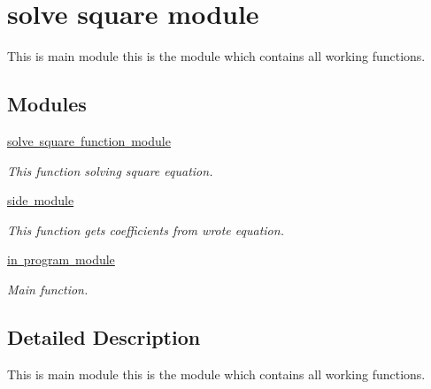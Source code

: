 \hypertarget{group__main__module}{}\section{solve square module}
\label{group__main__module}


This is main module this is the module which contains all working functions.  


\subsection*{Modules}
\begin{DoxyCompactItemize}
\item 
\mbox{\hyperlink{group__first__module}{solve square function module}}
\begin{DoxyCompactList}\small\item\em This function solving square equation. \end{DoxyCompactList}\item 
\mbox{\hyperlink{group__second__module}{side module}}
\begin{DoxyCompactList}\small\item\em This function get\textquotesingle{}s coefficients from wrote equation. \end{DoxyCompactList}\item 
\mbox{\hyperlink{group__third__module}{in program module}}
\begin{DoxyCompactList}\small\item\em Main function. \end{DoxyCompactList}\end{DoxyCompactItemize}


\subsection{Detailed Description}
This is main module this is the module which contains all working functions. 

